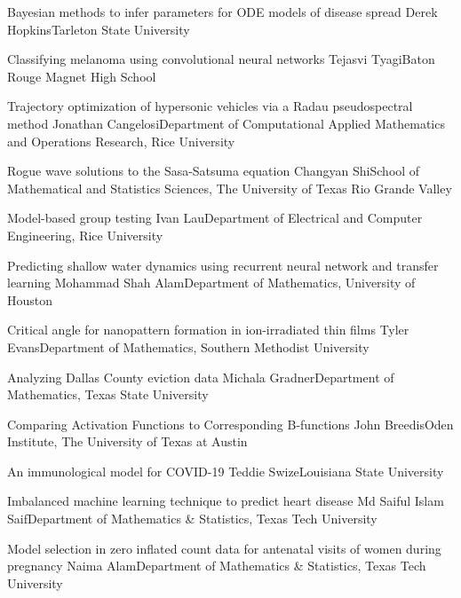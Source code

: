 \begin{posters}
\item\poster %
{Bayesian methods to infer parameters for ODE models of disease spread}
{Derek Hopkins}{Tarleton State University}

\item\poster %
{Classifying melanoma using convolutional neural networks}
{Tejasvi Tyagi}{Baton Rouge Magnet High School}

\item\poster %
{Trajectory optimization of hypersonic vehicles via a Radau pseudospectral method}
{Jonathan Cangelosi}{Department of Computational Applied Mathematics and Operations Research, Rice University}

\item\poster %
{Rogue wave solutions to the Sasa-Satsuma equation}
{Changyan Shi}{School of Mathematical and Statistics Sciences, The University of Texas Rio Grande Valley}

\item\poster %
{Model-based group testing}
{Ivan Lau}{Department of Electrical and Computer Engineering, Rice University}

\item\poster %
{Predicting shallow water dynamics using recurrent neural network and transfer learning}
{Mohammad Shah Alam}{Department of Mathematics, University of Houston}

\item\poster %
{Critical angle for nanopattern formation in ion-irradiated thin films}
{Tyler Evans}{Department of Mathematics, Southern Methodist University}

\item\poster %
{Analyzing Dallas County eviction data}
{Michala Gradner}{Department of Mathematics, Texas State University}

\item\poster %
{Comparing Activation Functions to Corresponding B-functions}
{John Breedis}{Oden Institute, The University of Texas at Austin}

\item\poster %
{An immunological model for COVID-19}
{Teddie Swize}{Louisiana State University}

\item\poster %
{Imbalanced machine learning technique to predict heart disease}
{Md Saiful Islam Saif}{Department of Mathematics \& Statistics, Texas Tech University}

\item\poster %
{Model selection in zero inflated count data for antenatal visits of women during pregnancy}
{Naima Alam}{Department of Mathematics \& Statistics, Texas Tech University}

\end{posters}

\room


